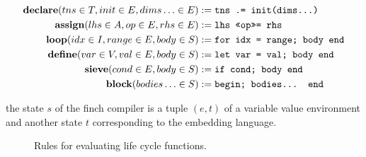 \begin{align*}
    \finchdeclare(tns \in T, init \in E, dims\ldots \in E) &:= \text{\texttt{tns .= init(dims...)}} \\
    \finchassign(lhs \in A, op \in E, rhs \in E) &:= \text{\texttt{lhs \texttt{<<op>>=} rhs}} \\
    \finchloop(idx \in I, range \in E, body \in S) &:= \text{\texttt{for idx = range; body end}} \\
    \finchdefine(var \in V, val \in E, body \in S) &:= \text{\texttt{let var = val; body end}} \\
    \finchsieve(cond \in E, body \in S) &:= \text{\texttt{if cond; body end}} \\
    \finchblock(bodies\ldots \in S) &:= \text{\texttt{begin; bodies... end}}
\end{align*}

the state $s$ of the finch compiler is a tuple $(e, t)$ of a variable value
environment and another state $t$ corresponding to the embedding language.


\begin{figure}
    \centering
    \begin{prooftree}  
    \end{prooftree}
    \hfill
    \vspace{2em}
    
    \begin{prooftree}  
    \end{prooftree}
      \vspace{2em}
      
    \begin{prooftree}  
    \end{prooftree}
    
    \caption{Rules for evaluating life cycle functions.}
    \label{fig:enter-label}
\end{figure}

